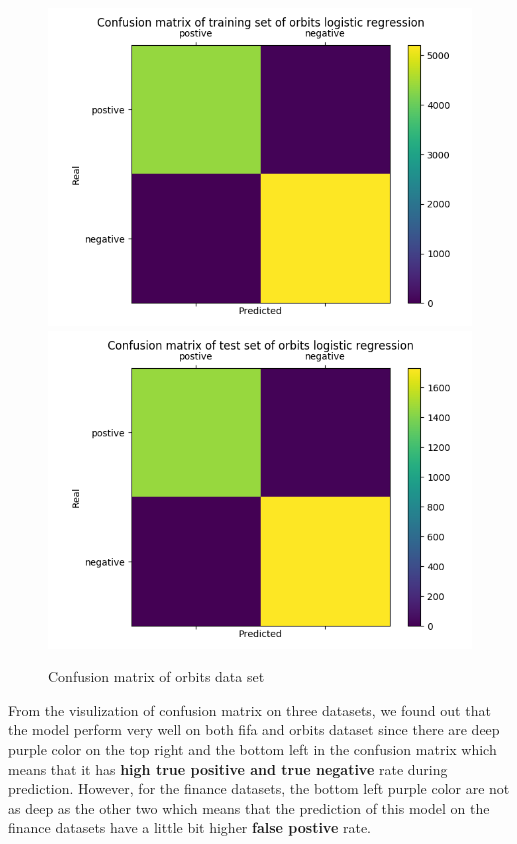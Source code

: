\documentclass{article}
\begin{document}
\begin{figure}[h]
  \centering
  \includegraphics[scale=0.3]{orbits_lo_train.png}
  \includegraphics[scale=0.3]{orbits_lo_test.png}
  \caption{Confusion matrix of orbits data set}
\end{figure}

From the visulization of confusion matrix on three datasets, we found out that the model perform very well on both fifa and orbits dataset since there are deep purple color on the top right and the bottom left in the confusion matrix which means that it has \textbf{high true positive and true negative} rate during prediction. However, for the finance datasets, the bottom left purple color are not as deep as the other two which means that the prediction of this model on the finance datasets have a little bit higher \textbf{false postive} rate.
\end{document}
